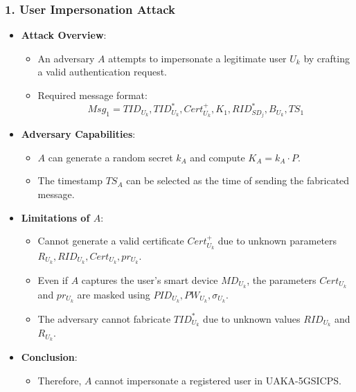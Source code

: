 \documentclass[9pt,handout]{beamer}
\begin{document}
\begin{frame}
    \frametitle{1. User Impersonation Attack}
    \begin{itemize}
        \item \textbf{Attack Overview}:
            \begin{itemize}
                \item An adversary \( A \) attempts to impersonate a legitimate user \( U_k \) by crafting a valid authentication request.
                \item Required message format: 
                \[
                Msg_1 = TID_{U_k}, TID^{*}_{U_k}, Cert^{+}_{U_k}, K_1, RID^{*}_{SD_j}, B_{U_k}, TS_1
                \]
            \end{itemize}
        \item \textbf{Adversary Capabilities}:
            \begin{itemize}
                \item \( A \) can generate a random secret \( k_A \) and compute \( K_A = k_A \cdot P \).
                \item The timestamp \( TS_A \) can be selected as the time of sending the fabricated message.
            \end{itemize}
        \item \textbf{Limitations of \( A \)}:
            \begin{itemize}
                \item Cannot generate a valid certificate \( Cert^{+}_{U_k} \) due to unknown parameters \( R_{U_k}, RID_{U_k}, Cert_{U_k}, pr_{U_k} \).
                \item Even if \( A \) captures the user’s smart device \( MD_{U_k} \), the parameters \( Cert_{U_k} \) and \( pr_{U_k} \) are masked using \( PID_{U_k}, PW_{U_k}, \sigma_{U_k} \).
                \item The adversary cannot fabricate \( TID^{*}_{U_k} \) due to unknown values \( RID_{U_k} \) and \( R_{U_k} \).
            \end{itemize}
        \item \textbf{Conclusion}:
            \begin{itemize}
                \item Therefore, \( A \) cannot impersonate a registered user in UAKA-5GSICPS.
            \end{itemize}
    \end{itemize}
\end{frame}
\end{document}
